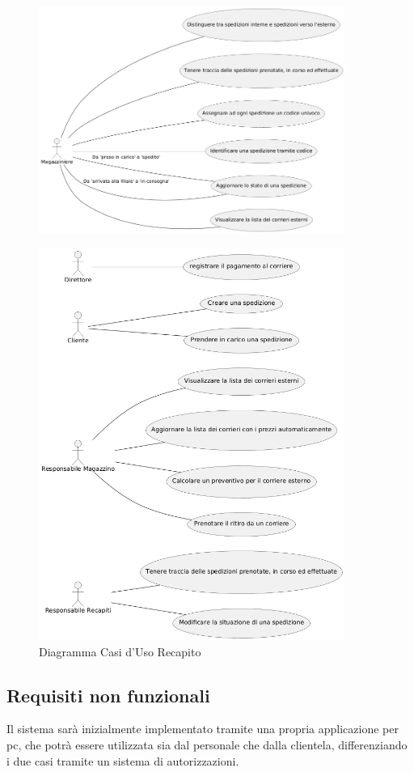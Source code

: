 \documentclass[a4paper,12pt]{article}
\begin{document}
  \begin{figure}[H]
    \centering
    \includegraphics[width=10cm]{assets/usecase_recapito_3.png}
  \end{figure}
  \begin{figure}[H]
    \centering
    \includegraphics[width=10cm]{assets/usecase_recapito_4.png}
    \caption{Diagramma Casi d'Uso Recapito}
  \end{figure}

  \subsection{Requisiti non funzionali}
  Il sistema sarà inizialmente implementato tramite una propria applicazione per pc, che potrà essere utilizzata sia dal personale
  che dalla clientela, differenziando i due casi tramite un sistema di autorizzazioni.
\end{document}
